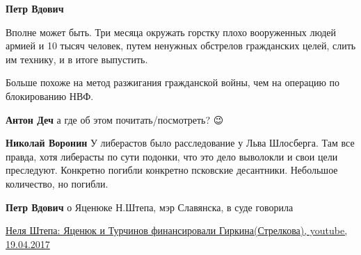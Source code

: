 \begin{itemize}
\begin{itemize}
 
\textbf{Петр Вдович} 

Вполне может быть. Три месяца окружать горстку плохо вооруженных людей армией и
10 тысяч человек, путем ненужных обстрелов гражданских целей, слить им технику,
и в итоге выпустить.

Больше похоже на метод разжигания гражданской войны, чем на операцию по
блокированию НВФ.


 
\textbf{Антон Деч} а где об этом почитать/посмотреть? 😉

 
\textbf{Николай Воронин}
У либерастов было расследование у Льва Шлосберга.
Там все правда, хотя либерасты по сути подонки, что это дело выволокли и свои цели преследуют.
Конкретно погибли конкретно псковские десантники. Небольшое количество, но погибли.

 
\textbf{Петр Вдович} о Яценюке Н.Штепа, мэр Славянска, в суде говорила

\href{https://www.youtube.com/watch?v=iPpvnZOeWkY&t=8s}{%
Неля Штепа: Яценюк и Турчинов финансировали Гиркина(Стрелкова), youtube, 19.04.2017%
}

 

\end{itemize}
\end{itemize}
